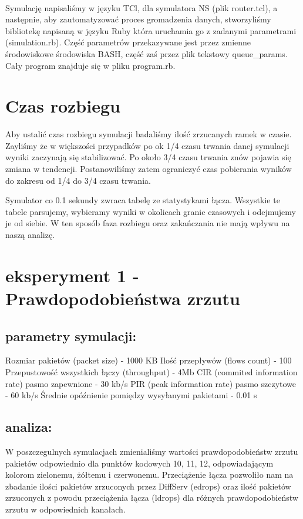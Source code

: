 \documentclass[a4paper]{article}
\begin{document}
\paragraph{}
Symulację napisaliśmy w języku TCl, dla symulatora NS (plik router.tcl), a następnie, aby zautomatyzować proces gromadzenia danych, stworzyliśmy bibliotekę napisaną w języku Ruby która uruchamia go z zadanymi parametrami (simulation.rb). Część parametrów przekazywane jest przez zmienne środowiskowe środowiska BASH, część zaś przez plik tekstowy queue\_params. Cały program znajduje się w pliku program.rb.


\section{Czas rozbiegu}
Aby ustalić czas rozbiegu symulacji badaliśmy ilość zrzucanych ramek w czasie. Zayliśmy że w większości przypadków po ok 1/4 czasu trwania danej symulacji wyniki zaczynają się stabilizować. Po około 3/4 czasu trwania znów pojawia się zmiana w tendencji. Postanowiliśmy zatem ograniczyć czas pobierania wyników do zakresu od 1/4 do 3/4 czasu trwania.

Symulator co 0.1 sekundy zwraca tabelę ze statystykami łącza. Wszystkie te tabele parsujemy, wybieramy wyniki w okolicach granic czasowych i odejmujemy je od siebie. W ten sposób faza rozbiegu oraz zakańczania nie mają wpływu na naszą analizę.


\section{eksperyment 1 - Prawdopodobieństwa zrzutu}



\subsection{parametry symulacji:}

Rozmiar pakietów (packet size) - 1000 KB
Ilość przepływów (flows count) - 100
Przepustowość wszystkich łączy (throughput) - 4Mb 
CIR (commited information rate) pasmo zapewnione - 30 kb/s
PIR (peak information rate) pasmo szczytowe - 60 kb/s
Średnie opóźnienie pomiędzy wysyłanymi pakietami - 0.01 s

\subsection{analiza:}

W poszczegulnych symulacjach zmienialiśmy wartości prawdopodobieństw zrzutu pakietów odpowiednio dla punktów kodowych 10, 11, 12, odpowiadającym kolorom zielonemu, żółtemu i czerwonemu.
Przeciążenie łącza pozwoliło nam na zbadanie ilości pakietów zrzuconych przez DiffServ (edrops) oraz ilość pakietów zrzuconych z powodu przeciążenia łącza (ldrops) dla różnych prawdopodobieństw zrzutu w odpowiednich kanałach.
\end{document}
